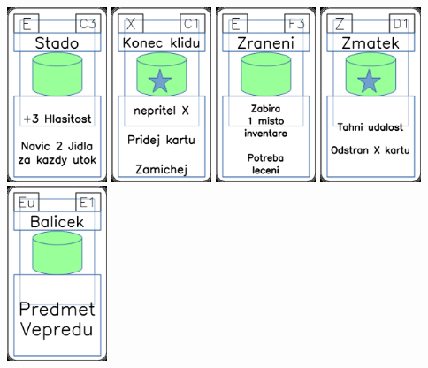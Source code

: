 \documentclass[a4paper]{article}
\begin{document}
	\includegraphics[width=3.0cm]{img-4_42}
	\includegraphics[width=3.0cm]{img-5_10}
	\includegraphics[width=3.0cm]{img-4_57}
	\includegraphics[width=3.0cm]{img-5_45}
	\includegraphics[width=3.0cm]{img-4_20}
\end{document}

